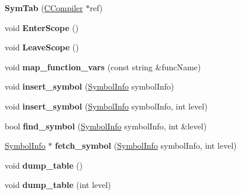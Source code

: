 \begin{DoxyCompactItemize}
\item 
\hypertarget{classSymTab_a20c7b65c7ffb728fa792e87258d381a2}{{\bfseries Sym\-Tab} (\hyperlink{classCCompiler}{C\-Compiler} $\ast$ref)}\label{classSymTab_a20c7b65c7ffb728fa792e87258d381a2}

\item 
\hypertarget{classSymTab_af335dd1ba840dfab4219856545d5d8ef}{void {\bfseries Enter\-Scope} ()}\label{classSymTab_af335dd1ba840dfab4219856545d5d8ef}

\item 
\hypertarget{classSymTab_afd2c44208cdad3ddfc85136136cd27c3}{void {\bfseries Leave\-Scope} ()}\label{classSymTab_afd2c44208cdad3ddfc85136136cd27c3}

\item 
\hypertarget{classSymTab_aaca51de0935bbdbf3fdf434deccccb92}{void {\bfseries map\-\_\-function\-\_\-vars} (const string \&func\-Name)}\label{classSymTab_aaca51de0935bbdbf3fdf434deccccb92}

\item 
\hypertarget{classSymTab_ad8e59e29c50f039570c5844871bf838c}{void {\bfseries insert\-\_\-symbol} (\hyperlink{structSymbolInfo}{Symbol\-Info} symbol\-Info)}\label{classSymTab_ad8e59e29c50f039570c5844871bf838c}

\item 
\hypertarget{classSymTab_a8372047f573c6d84fa231aa7e9842280}{void {\bfseries insert\-\_\-symbol} (\hyperlink{structSymbolInfo}{Symbol\-Info} symbol\-Info, int level)}\label{classSymTab_a8372047f573c6d84fa231aa7e9842280}

\item 
\hypertarget{classSymTab_a2aedd91e00780c889e60a60fc0795daf}{bool {\bfseries find\-\_\-symbol} (\hyperlink{structSymbolInfo}{Symbol\-Info} symbol\-Info, int \&level)}\label{classSymTab_a2aedd91e00780c889e60a60fc0795daf}

\item 
\hypertarget{classSymTab_ac0bfd9c56cfd8e697046178629adbebc}{\hyperlink{structSymbolInfo}{Symbol\-Info} $\ast$ {\bfseries fetch\-\_\-symbol} (\hyperlink{structSymbolInfo}{Symbol\-Info} symbol\-Info, int level)}\label{classSymTab_ac0bfd9c56cfd8e697046178629adbebc}

\item 
\hypertarget{classSymTab_ab4c005eb114053be22fdbe315542f55b}{void {\bfseries dump\-\_\-table} ()}\label{classSymTab_ab4c005eb114053be22fdbe315542f55b}

\item 
\hypertarget{classSymTab_ad5d45136f341bf024a226fe600fb4dcc}{void {\bfseries dump\-\_\-table} (int level)}\label{classSymTab_ad5d45136f341bf024a226fe600fb4dcc}


\end{DoxyCompactItemize}
